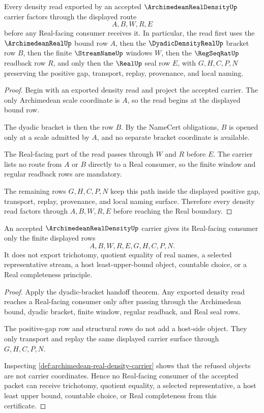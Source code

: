 \begin{theorem}
\label{thm:archimedean-real-density-dyadic-bracket-handoff}
Every density read exported by an accepted $\ArchimedeanRealDensityUp$
carrier factors through the displayed route
$$
A,B,W,R,E
$$
before any Real-facing consumer receives it. In particular, the read first
uses the $\ArchimedeanRealUp$ bound row $A$, then the
$\DyadicDensityRealUp$ bracket row $B$, then the finite $\StreamNameUp$
windows $W$, then the $\RegSeqRatUp$ readback row $R$, and only then the
$\RealUp$ seal row $E$, with $G,H,C,P,N$ preserving the positive gap,
transport, replay, provenance, and local naming.
\end{theorem}
\begin{proof}
Begin with an exported density read and project the accepted carrier. The
only Archimedean scale coordinate is $A$, so the read begins at the displayed
bound row.

The dyadic bracket is then the row $B$. By the NameCert obligations, $B$ is
opened only at a scale admitted by $A$, and no separate bracket coordinate is
available.

The Real-facing part of the read passes through $W$ and $R$ before $E$. The
carrier lists no route from $A$ or $B$ directly to a Real consumer, so the
finite window and regular readback rows are mandatory.

The remaining rows $G,H,C,P,N$ keep this path inside the displayed positive
gap, transport, replay, provenance, and local naming surface. Therefore every
density read factors through $A,B,W,R,E$ before reaching the Real boundary.
\end{proof}

\begin{theorem}
\label{thm:archimedean-real-density-real-boundary}
An accepted $\ArchimedeanRealDensityUp$ carrier gives its Real-facing
consumer only the finite displayed rows
$$
A,B,W,R,E,G,H,C,P,N.
$$
It does not export trichotomy, quotient equality of real names, a selected
representative stream, a host least-upper-bound object, countable choice, or a
Real completeness principle.
\end{theorem}
\begin{proof}
Apply the dyadic-bracket handoff theorem. Any exported density read reaches a
Real-facing consumer only after passing through the Archimedean bound, dyadic
bracket, finite window, regular readback, and Real seal rows.

The positive-gap row and structural rows do not add a host-side object. They
only transport and replay the same displayed carrier surface through
$G,H,C,P,N$.

Inspecting \autoref{def:archimedean-real-density-carrier} shows that the
refused objects are not carrier coordinates. Hence no Real-facing consumer of
the accepted packet can receive trichotomy, quotient equality, a selected
representative, a host least upper bound, countable choice, or Real
completeness from this certificate.
\end{proof}

